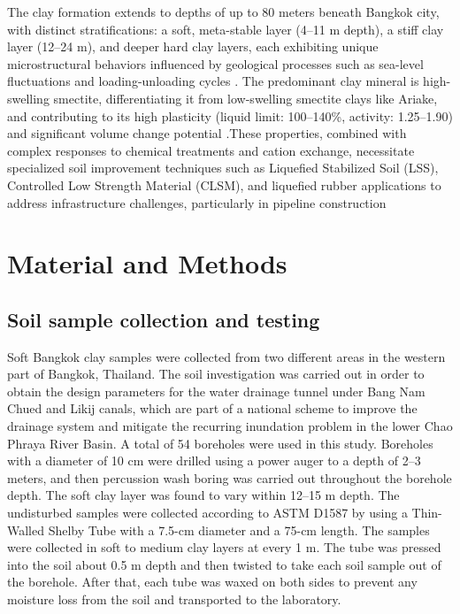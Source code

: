\documentclass[12pt,a4paper]{article}
\begin{document}
	The clay formation extends to depths of up to 80 meters beneath Bangkok city, with distinct stratifications: a soft, meta-stable layer (4–11 m depth), a stiff clay layer (12–24 m), and deeper hard clay layers, each exhibiting unique microstructural behaviors influenced by geological processes such as sea-level fluctuations and loading-unloading cycles \cite{Krit_Saowiang_Pham_Huy_Giao_2019}. The predominant clay mineral is high-swelling smectite, differentiating it from low-swelling smectite clays like Ariake, and contributing to its high plasticity (liquid limit: 100–140\%, activity: 1.25–1.90) and significant volume change potential \cite{OHTSUBO200011}.These properties, combined with complex responses to chemical treatments and cation exchange, necessitate specialized soil improvement techniques such as Liquefied Stabilized Soil (LSS), Controlled Low Strength Material (CLSM), and liquefied rubber applications to address infrastructure challenges, particularly in pipeline construction \cite{Prum_Jumnongpol_Eamchotchawalit_Kantiwattanakul_Sooksatra_Jarearnsiri_Passananon_2019}
	
	\section{Material and Methods}
	
	\subsection{Soil sample collection and testing}
	
	Soft Bangkok clay samples were collected from two different areas in the western part of Bangkok, Thailand. The soil investigation was carried out in order to obtain the design parameters for the water drainage tunnel under Bang Nam Chued and Likij canals, which are part of a national scheme to improve the drainage system and mitigate the recurring inundation problem in the lower Chao Phraya River Basin. A total of 54 boreholes were used in this study. Boreholes with a diameter of 10 cm were drilled using a power auger to a depth of 2–3 meters, and then percussion wash boring was carried out throughout the borehole depth. The soft clay layer was found to vary within 12–15 m depth. The undisturbed samples were collected according to ASTM D1587 by using a Thin-Walled Shelby Tube with a 7.5-cm diameter and a 75-cm length. The samples were collected in soft to medium clay layers at every 1 m. The tube was pressed into the soil about 0.5 m depth and then twisted to take each soil sample out of the borehole. After that, each tube was waxed on both sides to prevent any moisture loss from the soil and transported to the laboratory.
	
\end{document}
